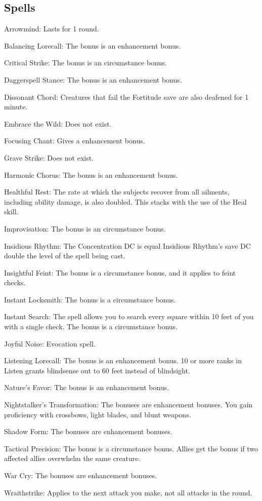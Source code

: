 \subsection{Spells}
\begin{itemize*}
\item Arrowmind: Lasts for 1 round.
\item Balancing Lorecall: The bonus is an enhancement bonus.
\item Critical Strike: The bonus is an circumstance bonus.
\item Daggerspell Stance: The bonus is an enhancement bonus.
\item Dissonant Chord: Creatures that fail the Fortitude save are also deafened for 1 minute.
\item Embrace the Wild: Does not exist.
\item Focusing Chant: Gives a  enhancement bonus.
\item Grave Strike: Does not exist.
\item Harmonic Chorus: The bonus is an enhancement bonus.
\item Healthful Rest: The rate at which the subjects recover from all ailments, including ability damage, is also doubled. This stacks with the use of the Heal skill.
\item Improvisation: The bonus is an circumstance bonus.
\item Insidious Rhythm: The Concentration DC is equal Insidious Rhythm's save DC \add double the level of the spell being cast.
\item Insightful Feint: The bonus is a circumstance bonus, and it applies to feint checks.
\item Instant Locksmith: The bonus is a circumstance bonus.
\item Instant Search: The spell allows you to search every square within 10 feet of you with a single check. The bonus is a circumstance bonus.
\item Joyful Noise: Evocation spell.
\item Listening Lorecall: The bonus is an enhancement bonus. 10 or more ranks in Listen grants blindsense out to 60 feet instead of blindsight.
\item Nature's Favor: The bonus is an enhancement bonus.
\item Nightstalker's Transformation: The bonuses are enhancement bonuses. You gain proficiency with crossbows, light blades, and blunt weapons.
\item Shadow Form: The bonuses are enhancement bonuses.
\item Tactical Precision: The bonus is a circumstance bonus. Allies get the bonus if two affected allies overwhelm the same creature.
\item War Cry: The bonuses are enhancement bonuses.
\item Wraithstrike: Applies to the next attack you make, not all attacks in the round.
\end{itemize*}


